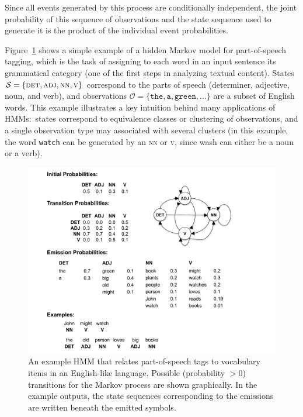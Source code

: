 \noindent Since all events generated by this process are conditionally
independent, the joint probability of this sequence of observations
and the state sequence used to generate it is the product of the
individual event probabilities.

Figure~\ref{chapter6_hmm_example} shows a simple example of a hidden
Markov model for part-of-speech tagging, which is the task of
assigning to each word in an input sentence its grammatical category
(one of the first steps in analyzing textual content).  States
$\mathcal{S} = \{ \textsc{det}, \textsc{adj}, \textsc{nn}, \textsc{v}
\}$ correspond to the parts of speech (determiner, adjective, noun,
and verb), and observations $\mathcal{O} = \{ \texttt{the},
\texttt{a}, \texttt{green} , \ldots \}$ are a subset of English words.
This example illustrates a key intuition behind many applications of
HMMs:\ states correspond to equivalence classes or clustering of
observations, and a single observation type may associated with
several clusters (in this example, the word \texttt{watch} can be
generated by an \textsc{nn} or \textsc{v}, since wash can either be a
noun or a verb).

\begin{figure}
\begin{center}
\includegraphics[scale=0.6]{figures/fig-ch6-POS-HMM.pdf}
\end{center}
\caption{An example HMM that relates part-of-speech tags to vocabulary items in an English-like language.  Possible (probability $>0$) transitions for the Markov process are shown graphically. In the example outputs, the state sequences corresponding to the emissions are written beneath the emitted symbols.}\label{chapter6_hmm_example}
\end{figure}

